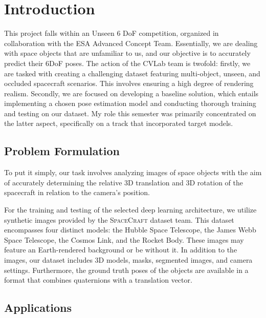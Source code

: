 
\chapter{Introduction}\label{chapter:introduction}
\renewcommand{\headrulewidth}{0.4pt}

This project falls within an Unseen 6 \ac{DoF} competition, organized in collaboration with the \ac{ESA} Advanced Concept Team. Essentially, we are dealing with space objects that are unfamiliar to us, and our objective is to accurately predict their 6\ac{DoF} poses. The action of the \ac{CVLab} team is twofold: firstly, we are tasked with creating a challenging dataset featuring multi-object, unseen, and occluded spacecraft scenarios. This involves ensuring a high degree of rendering realism. Secondly, we are focused on developing a baseline solution, which entails implementing a chosen pose estimation model and conducting thorough training and testing on our dataset. My role this semester was primarily concentrated on the latter aspect, specifically on a track that incorporated target models.

\section{Problem Formulation}

To put it simply, our task involves analyzing images of space objects with the aim of accurately determining the relative 3D translation and 3D rotation of the spacecraft in relation to the camera's position.

For the training and testing of the selected deep learning architecture, we utilize synthetic images provided by the \textsc{SpaceCraft} dataset team. This dataset encompasses four distinct models: the Hubble Space Telescope, the James Webb Space Telescope, the Cosmos Link, and the Rocket Body. These images may feature an Earth-rendered background or be without it. In addition to the images, our dataset includes 3D models, masks, segmented images, and camera settings. Furthermore, the ground truth poses of the objects are available in a format that combines quaternions with a translation vector.

\section{Applications}

